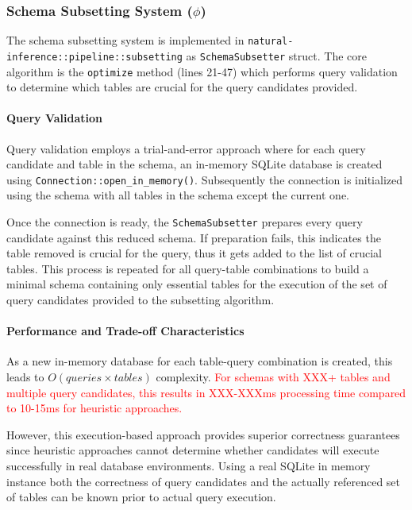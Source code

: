 \subsubsection{Schema Subsetting System ($\phi$)}

The schema subsetting system is implemented in
\texttt{natural-inference::pipeline::subsetting} as
\texttt{SchemaSubsetter} struct. The core algorithm is the \texttt{optimize}
method (lines 21-47) which performs query validation to determine
which tables are crucial for the query candidates provided.

\paragraph{Query Validation}

Query validation employs a trial-and-error approach where for each query
candidate and table in the schema, an in-memory SQLite database
is created using \texttt{Connection::open\_in\_memory()}. Subsequently the
connection is initialized using the schema with all tables in the schema except
the current one.

Once the connection is ready, the \texttt{SchemaSubsetter} prepares every
query candidate against this reduced schema. If preparation fails, this
indicates the table removed is crucial for the query, thus it gets added to the
list of crucial tables. This process is repeated for all query-table
combinations to build a minimal schema containing only essential tables for the
execution of the set of query candidates provided to the subsetting algorithm.

\paragraph{Performance and Trade-off Characteristics}

As a new in-memory database for each table-query combination is created, this
leads to $O(queries \times tables)$ complexity. \textcolor{red}{For schemas
with XXX+ tables and multiple query candidates, this results in XXX-XXXms
processing time compared to 10-15ms for heuristic approaches.}

However, this execution-based approach provides superior correctness guarantees since heuristic
approaches cannot determine whether candidates will execute successfully in real
database environments. Using a real SQLite in memory instance both the correctness of
query candidates and the actually referenced set of tables can be known prior
to actual query execution.

